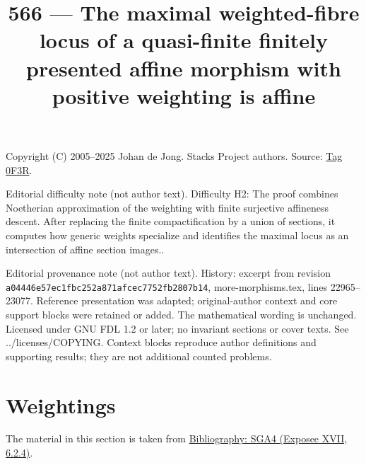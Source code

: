 \documentclass{amsart}
\theoremstyle{plain}
\theoremstyle{definition}
\theoremstyle{remark}
\numberwithin{equation}{subsection}
\begin{document}
\title[Stacks Project, Tag 0F3R]{566 --- The maximal weighted-fibre locus of a quasi-finite finitely presented affine morphism with positive weighting is affine}
\maketitle
\noindent Copyright (C) 2005--2025 Johan de Jong. Stacks Project authors. Source: \href{https://stacks.math.columbia.edu/tag/0F3R}{Tag 0F3R}.

\noindent Editorial difficulty note (not author text). Difficulty H2: The proof combines Noetherian approximation of the weighting with finite surjective affineness descent. After replacing the finite compactification by a union of sections, it computes how generic weights specialize and identifies the maximal locus as an intersection of affine section images..

\noindent Editorial provenance note (not author text). History: excerpt from revision \texttt{a0444\allowbreak 6e57e\allowbreak c1fbc\allowbreak 252a8\allowbreak 71afc\allowbreak ec775\allowbreak 2fb28\allowbreak 07b14}, more-morphisms.tex, lines 22965--23077. Reference presentation was adapted; original-author context and core support blocks were retained or added. The mathematical wording is unchanged. Licensed under GNU FDL 1.2 or later; no invariant sections or cover texts. See ../licenses/COPYING. Context blocks reproduce author definitions and supporting results; they are not additional counted problems.

\section{Weightings}
\label{section-weightings}

\noindent
The material in this section is taken from \href{https://stacks.math.columbia.edu/bibliography}{Bibliography: SGA4 (Exposee XVII, 6.2.4)}.
\end{document}
